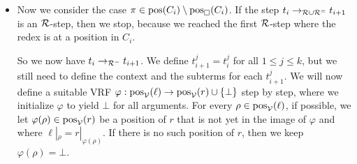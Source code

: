 \begin{myproof}
\begin{itemize}
        \item Now we consider the case $\pi \in \mathrm{pos}(C_i) \setminus \mathrm{pos}_{\Box}(C_i)$.
        If the step $t_i \to_{\mathcal{R} \cup \mathcal{R}^{=}} t_{i+1}$ is an $\mathcal{R}$-step, then we stop, because
        we reached the first $\mathcal{R}$-step where the redex is at a position in $C_i$.

        So we now have $t_i \to_{ \mathcal{R}^{=}} t_{i+1}$. We define $t_{i+1}^j = t_i^j$ for all
        $1 \leq j \leq k$, but we still need to define the context and the subterms for
        each $t_{i+1}^j$. We will now define a suitable VRF
        $\varphi:\mathrm{pos}_{\mathcal{V}}(\ell)\to \mathrm{pos}_{\mathcal{V}}(r) \cup \{ \bot \}$ step by step, where we initialize
        $\varphi$ to yield $\bot$ for all arguments.
        For every $\rho \in \mathrm{pos}_{\mathcal{V}}(\ell)$,
        if possible,
        we let
        $\varphi(\rho) \in \mathrm{pos}_{\mathcal{V}}(r)$ be a position of $r$ that is not yet in the
        image of $\varphi$ and where
        $\ell|_{\rho} = r|_{\varphi(\rho)}$. If there is no such position
        of $r$, then we keep $\varphi(\rho) = \bot$.
 

\end{itemize}
\end{myproof}
